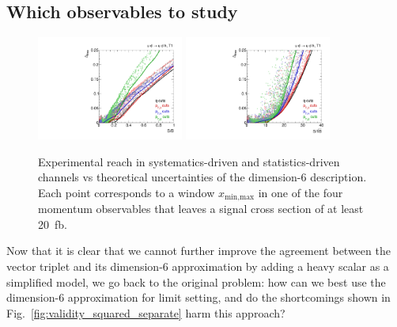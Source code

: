 \subsection{Which observables to study}

\begin{figure}[t]
  \includegraphics[width=0.43\textwidth]{fig/validity/WBF_cuts_T1_SB.pdf}
  \hspace*{0.05\textwidth}
  \includegraphics[width=0.43\textwidth]{fig/validity/WBF_cuts_T1_SsqrtB.pdf}
  \caption{Experimental reach in systematics-driven and
    statistics-driven channels vs theoretical uncertainties of the
    dimension-6 description. Each point corresponds to a window
    $x_\text{min,max}$ in one of the four momentum observables that leaves a signal
    cross section of at least 20~fb.}
  \label{fig:validity_cuts}
\end{figure}

Now that it is clear that we cannot further improve the agreement
between the vector triplet and its dimension-6 approximation by adding
a heavy scalar as a simplified model, we go back to the original
problem: how can we best use the dimension-6 approximation for limit
setting, and do the shortcomings shown in
Fig.~\ref{fig:validity_squared_separate} harm this approach?

